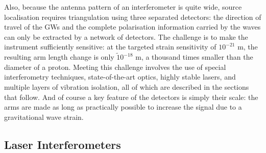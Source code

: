 \documentclass[binding=0.6cm, LaM]{sapthesis}
\begin{document}


	Also, because the antenna pattern of an interferometer is quite wide, 
	source localisation requires triangulation using three separated detectors: 
	the direction of travel of the GWs and the complete polarisation information carried by the waves can only be extracted by a network of detectors. 
	The challenge is to make the instrument sufficiently sensitive: 
	at the targeted strain sensitivity of $10^{−21}$ m, the resulting arm length change is only $\tilde 10^{-18}$ m, 
	a thousand times smaller than the diameter of a proton. 
	Meeting this challenge involves the use of special interferometry techniques, 
	state-of-the-art optics, highly stable lasers, and multiple layers of vibration isolation, 
	all of which are described in the sections that follow. And of course a key feature of the detectors is simply their scale: 
	the arms are made as long as practically possible to increase the signal due to a gravitational wave strain. 

\subsection{Laser Interferometers}
\end{document}
